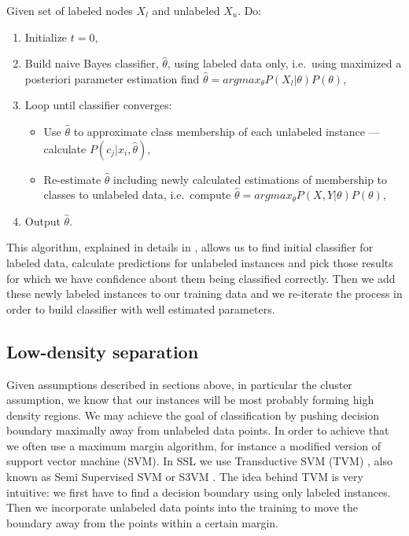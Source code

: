 \documentclass[12pt, a4paper, pdflatex]{report}
\begin{document}
Given set of labeled nodes $X_l$ and unlabeled $X_u$. Do:\\
\begin{enumerate}
\item Initialize $t  = 0 $,
\item Build naive Bayes classifier, $ \hat{\theta}$, using labeled data only, i.e.\ using maximized a posteriori parameter estimation find $ \hat{\theta} = argmax_{\theta} P(X_{l} | \theta)P(\theta) $,
\item Loop until classifier converges:
	\begin{itemize}
	\item Use $\hat{\theta}$ to approximate class membership of each unlabeled instance --- calculate $ P(c_j|x_i, \hat{\theta})$,
	\item Re-estimate $\hat{\theta}$ including newly calculated estimations of membership to classes to unlabeled data, i.e.\ compute $ \hat{\theta} = argmax_{\theta} P(X, Y | \theta)P(\theta) $,
	\end{itemize}
\item Output $\hat{\theta}$.

\end{enumerate}

This algorithm, explained in details in \cite{chapelle06}, allows us to find initial classifier for labeled data, calculate predictions for unlabeled instances and pick those results for which we have confidence about them being classified correctly. Then we add these newly labeled instances to our training data and we re-iterate the process in order to build classifier with well estimated parameters.

\subsection{Low-density separation}

Given assumptions described in sections above, in particular the cluster assumption, we know that our instances will be most probably forming high density regions. We may achieve the goal of classification by pushing decision boundary maximally away from unlabeled data points.
In order to achieve that we often use a maximum margin algorithm, for instance a modified version of support vector machine (SVM)\cite{chapelle06,Zhu06semi}. In SSL we use Transductive SVM (TVM) \cite{chapelle06}, also known as Semi Supervised SVM or S3VM \cite{Zhu06semi}.
The idea behind TVM is very intuitive: we first have to find a decision boundary using only labeled instances. Then we incorporate unlabeled data points into the training to move the boundary away from the points within a certain margin.\\[1cm]
\end{document}
